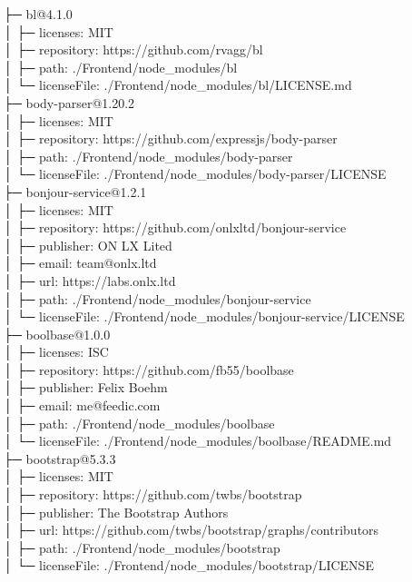 ├─ bl@4.1.0\\
│  ├─ licenses: MIT\\
│  ├─ repository: https://github.com/rvagg/bl\\
│  ├─ path: ./Frontend/node\_modules/bl\\
│  └─ licenseFile: ./Frontend/node\_modules/bl/LICENSE.md\\
├─ body-parser@1.20.2\\
│  ├─ licenses: MIT\\
│  ├─ repository: https://github.com/expressjs/body-parser\\
│  ├─ path: ./Frontend/node\_modules/body-parser\\
│  └─ licenseFile: ./Frontend/node\_modules/body-parser/LICENSE\\
├─ bonjour-service@1.2.1\\
│  ├─ licenses: MIT\\
│  ├─ repository: https://github.com/onlxltd/bonjour-service\\
│  ├─ publisher: ON LX Lited\\
│  ├─ email: team@onlx.ltd\\
│  ├─ url: https://labs.onlx.ltd\\
│  ├─ path: ./Frontend/node\_modules/bonjour-service\\
│  └─ licenseFile: ./Frontend/node\_modules/bonjour-service/LICENSE\\
├─ boolbase@1.0.0\\
│  ├─ licenses: ISC\\
│  ├─ repository: https://github.com/fb55/boolbase\\
│  ├─ publisher: Felix Boehm\\
│  ├─ email: me@feedic.com\\
│  ├─ path: ./Frontend/node\_modules/boolbase\\
│  └─ licenseFile: ./Frontend/node\_modules/boolbase/README.md\\
├─ bootstrap@5.3.3\\
│  ├─ licenses: MIT\\
│  ├─ repository: https://github.com/twbs/bootstrap\\
│  ├─ publisher: The Bootstrap Authors\\
│  ├─ url: https://github.com/twbs/bootstrap/graphs/contributors\\
│  ├─ path: ./Frontend/node\_modules/bootstrap\\
│  └─ licenseFile: ./Frontend/node\_modules/bootstrap/LICENSE\\
